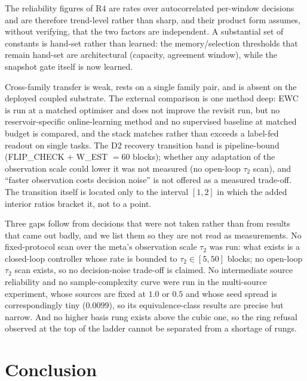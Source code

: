 \documentclass[preprint,12pt]{elsarticle}
\begin{document}
The
reliability figures of R4 are rates over autocorrelated per-window decisions
and are therefore trend-level rather than sharp, and their product form
assumes, without verifying, that the two factors are independent. A
substantial set of constants is hand-set rather than learned: the
memory/selection thresholds that remain hand-set are architectural
(capacity, agreement window), while the snapshot gate itself is now learned.

Cross-family transfer is weak, rests on a single family pair, and is absent on
the deployed coupled substrate. The external comparison is one method deep:
EWC \cite{kirkpatrick2017} is run at a matched optimiser and does not improve
the revisit run, but no reservoir-specific online-learning method and no
supervised baseline at matched budget is compared,
and the stack matches rather than exceeds a label-fed readout on single
tasks. The D2 recovery transition band is
pipeline-bound (FLIP\_CHECK $+$ W\_EST $=60$ blocks); whether any
adaptation of the observation scale could lower it was not measured
(no open-loop $\tau_2$ scan), and ``faster observation costs decision
noise'' is not offered as a measured trade-off. The transition itself is
located only to the interval $[1,2]$ in which the added interior ratios
bracket it, not to a point.

Three gaps follow from decisions that were not
taken rather than from results that came out badly, and we list them so they
are not read as measurements. No fixed-protocol scan over the meta's
observation scale $\tau_2$ was run: what exists is a closed-loop controller
whose rate is bounded to $\tau_2\in[5,50]$ blocks; no open-loop $\tau_2$
scan exists, so no decision-noise trade-off is claimed. No intermediate source reliability and no
sample-complexity curve were run in the multi-source experiment, whose sources
are fixed at $1.0$ or $0.5$ and whose seed spread is correspondingly tiny
($0.0099$), so its equivalence-class results are precise but narrow. And no
higher basis rung exists above the cubic one, so the ring refusal observed at
the top of the ladder cannot be separated from a shortage of rungs.

\section{Conclusion}
\label{sec:concl}
\end{document}
